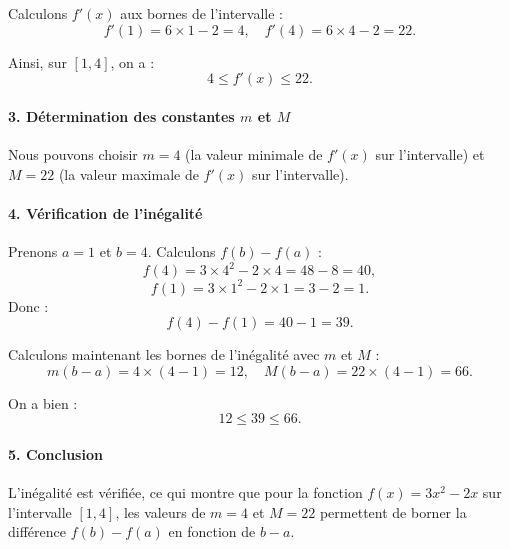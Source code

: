 \documentclass[12pt]{article}
\begin{document}
Calculons \( f'(x) \) aux bornes de l'intervalle :
\[
f'(1) = 6 \times 1 - 2 = 4, \quad f'(4) = 6 \times 4 - 2 = 22.
\]

Ainsi, sur \([1, 4]\), on a :
\[
4 \leq f'(x) \leq 22.
\]

\paragraph{3. Détermination des constantes \( m \) et \( M \)} Nous pouvons choisir \( m = 4 \) (la valeur minimale de \( f'(x) \) sur l'intervalle) et \( M = 22 \) (la valeur maximale de \( f'(x) \) sur l'intervalle).

\paragraph{4. Vérification de l'inégalité} Prenons \( a = 1 \) et \( b = 4 \). Calculons \( f(b) - f(a) \) :
\[
f(4) = 3 \times 4^2 - 2 \times 4 = 48 - 8 = 40,
\]
\[
f(1) = 3 \times 1^2 - 2 \times 1 = 3 - 2 = 1.
\]
Donc :
\[
f(4) - f(1) = 40 - 1 = 39.
\]

Calculons maintenant les bornes de l'inégalité avec \( m \) et \( M \) :
\[
m(b - a) = 4 \times (4 - 1) = 12, \quad M(b - a) = 22 \times (4 - 1) = 66.
\]

On a bien :
\[
12 \leq 39 \leq 66.
\]

\paragraph{5. Conclusion} L'inégalité est vérifiée, ce qui montre que pour la fonction \( f(x) = 3x^2 - 2x \) sur l'intervalle \([1, 4]\), les valeurs de \( m = 4 \) et \( M = 22 \) permettent de borner la différence \( f(b) - f(a) \) en fonction de \( b - a \).

\end{document}
